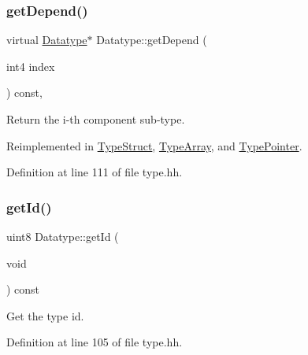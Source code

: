 \subsubsection{\texorpdfstring{getDepend()}{getDepend()}}
{\footnotesize\ttfamily virtual \mbox{\hyperlink{class_datatype}{Datatype}}$\ast$ Datatype\+::get\+Depend (\begin{DoxyParamCaption}\item[{int4}]{index }\end{DoxyParamCaption}) const\hspace{0.3cm}{\ttfamily [inline]}, {\ttfamily [virtual]}}



Return the i-\/th component sub-\/type. 



Reimplemented in \mbox{\hyperlink{class_type_struct_ae60274464ed0003c0ee86f8bf3fa28c8}{Type\+Struct}}, \mbox{\hyperlink{class_type_array_ab5d2632de93ac8f4e0d36d804a2debda}{Type\+Array}}, and \mbox{\hyperlink{class_type_pointer_ac63c41e423f88eca13459135f86c7d32}{Type\+Pointer}}.



Definition at line 111 of file type.\+hh.

\mbox{\label{class_datatype_a6b0374e8a6d4cbb1d2369dd055d72127}} 
\subsubsection{\texorpdfstring{getId()}{getId()}}
{\footnotesize\ttfamily uint8 Datatype\+::get\+Id (\begin{DoxyParamCaption}\item[{void}]{ }\end{DoxyParamCaption}) const\hspace{0.3cm}{\ttfamily [inline]}}



Get the type id. 



Definition at line 105 of file type.\+hh.

